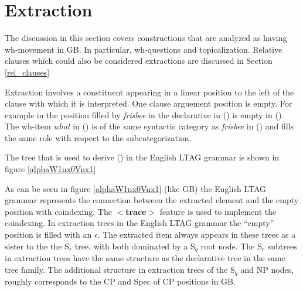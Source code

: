 \section{Extraction}
The discussion in this section covers constructions that are analyzed
as having wh-movement in GB.  In particular, wh-questions and
topicalization. Relative clauses which could also be considered
extractions are discussed in Section
\ref{rel_clauses}

Extraction involves a constituent appearing in a linear position to
the left of the clause with which it is interpreted. One clause
arguement position is empty. For example in the position filled by
{\it frisbee} in the declarative in () is empty in (). The
wh-item {\it what} in () is of the same syntactic category as
{\it frisbee} in () and fills the same role with respect to the
subcategorization.


The tree that is used to derive () in the English LTAG grammar  is
shown in figure \ref{alphaW1nx0Vnx1}

\begin{figure}[htbp]
\end{figure}

As can be seen in figure \ref{alphaW1nx0Vnx1} (like GB) the English
LTAG grammar represents the connection between the extracted element
and the empty position with coindexing.  The {\bf $<$trace$>$} feature
is used to implement the coindexing.  In extraction trees in the
English LTAG grammar the ``empty'' position is filled with an
$\epsilon$.  The extracted item always appears in these trees as a
sister to the the S$_{r}$ tree, with both dominated by a S$_{q}$ root
node.  The S$_{r}$ subtrees in extraction trees have the same
structure as the declarative tree in the same tree family.  The
additional structure in extraction trees of the S$_{q}$ and NP nodes,
roughly corresponds to the CP and Spec of CP positions in GB.



